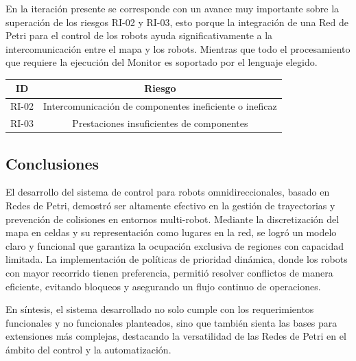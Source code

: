En la iteración presente se corresponde con un avance muy importante sobre la superación de los riesgos RI-02 y RI-03, esto porque la integración de una Red de Petri para el control de los robots ayuda significativamente a la intercomunicación entre el mapa y los robots. Mientras que todo el procesamiento que requiere la ejecución del Monitor es soportado por el lenguaje elegido.

\begin{center}
    \begin{tabular} {
        | c| c |}
        \hline \rowcolor{test_header_color}
            ID & Riesgo \\
        \hline
            RI-02 & Intercomunicación de componentes ineficiente o ineficaz \\
        \hline
            RI-03 & Prestaciones insuficientes de componentes \\
        \hline
    \end{tabular}
\end{center}

\subsection{Conclusiones}
El desarrollo del sistema de control para robots omnidireccionales, basado en Redes de Petri, demostró ser altamente efectivo en la gestión de trayectorias y prevención de colisiones en entornos multi-robot. Mediante la discretización del mapa en celdas y su representación como lugares en la red, se logró un modelo claro y funcional que garantiza la ocupación exclusiva de regiones con capacidad limitada. La implementación de políticas de prioridad dinámica, donde los robots con mayor recorrido tienen preferencia, permitió resolver conflictos de manera eficiente, evitando bloqueos y asegurando un flujo continuo de operaciones.

En síntesis, el sistema desarrollado no solo cumple con los requerimientos funcionales y no funcionales planteados, sino que también sienta las bases para extensiones más complejas, destacando la versatilidad de las Redes de Petri en el ámbito del control y la automatización.